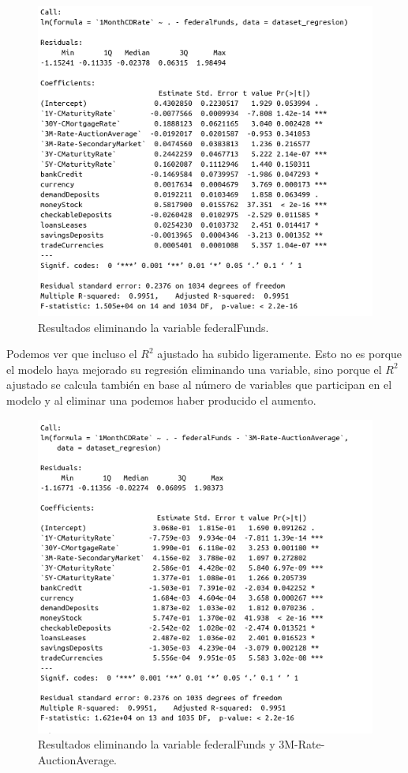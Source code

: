 \documentclass[12pt,a4paper]{article}
\begin{document}
\begin{figure}[H]
	\centering 
	\includegraphics[scale=0.65]{./Imagenes/Regresion/regresion_multiple2.png}
	\caption{Resultados eliminando la variable federalFunds.}
\end{figure}

Podemos ver que incluso el $R^2$ ajustado ha subido ligeramente. Esto no es porque el modelo haya mejorado su regresión eliminando una variable, sino porque el $R^2$ ajustado se calcula también en base al número de variables que participan en el modelo y al eliminar una podemos haber producido el aumento.

\begin{figure}[H]
	\centering 
	\includegraphics[scale=0.65]{./Imagenes/Regresion/regresion_multiple3.png}
	\caption{Resultados eliminando la variable federalFunds y 3M-Rate-AuctionAverage.}
\end{figure}
\end{document}
